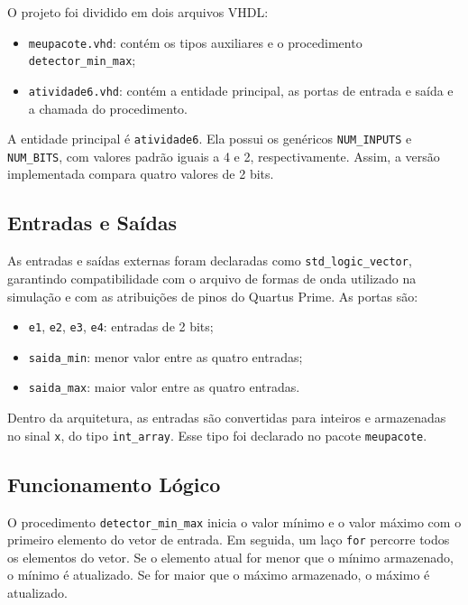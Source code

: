 \documentclass[12pt,a4paper, brazil]{article}
\begin{document}
O projeto foi dividido em dois arquivos VHDL:

\begin{itemize}
    \item \texttt{meupacote.vhd}: contém os tipos auxiliares e o procedimento \texttt{detector\_min\_max};
    \item \texttt{atividade6.vhd}: contém a entidade principal, as portas de entrada e saída e a chamada do procedimento.
\end{itemize}

A entidade principal é \texttt{atividade6}. Ela possui os genéricos \texttt{NUM\_INPUTS} e \texttt{NUM\_BITS}, com valores padrão iguais a 4 e 2, respectivamente. Assim, a versão implementada compara quatro valores de 2 bits.

\subsection{Entradas e Saídas}

As entradas e saídas externas foram declaradas como \texttt{std\_logic\_vector}, garantindo compatibilidade com o arquivo de formas de onda utilizado na simulação e com as atribuições de pinos do Quartus Prime. As portas são:

\begin{itemize}
    \item \texttt{e1}, \texttt{e2}, \texttt{e3}, \texttt{e4}: entradas de 2 bits;
    \item \texttt{saida\_min}: menor valor entre as quatro entradas;
    \item \texttt{saida\_max}: maior valor entre as quatro entradas.
\end{itemize}

Dentro da arquitetura, as entradas são convertidas para inteiros e armazenadas no sinal \texttt{x}, do tipo \texttt{int\_array}. Esse tipo foi declarado no pacote \texttt{meupacote}.

\subsection{Funcionamento Lógico}

O procedimento \texttt{detector\_min\_max} inicia o valor mínimo e o valor máximo com o primeiro elemento do vetor de entrada. Em seguida, um laço \texttt{for} percorre todos os elementos do vetor. Se o elemento atual for menor que o mínimo armazenado, o mínimo é atualizado. Se for maior que o máximo armazenado, o máximo é atualizado.
\end{document}

